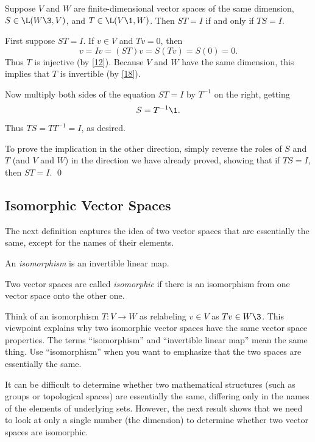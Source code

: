 {Suppose $V$ and $W$ are finite-dimensional vector spaces of the same dimension, $S \in \L(W\3,V)$, and $T \in \L(V\1, W)$.  Then $ST = I$ if and only if $TS = I$.}

\proof
First suppose
$
ST = I$.
If $v \in V$ and $Tv = 0$, then
\[
v = Iv= (ST)v = S(Tv) = S(0) = 0.
\]
Thus $T$ is injective (by \ref{12}). Because $V$ and $W$ have the same dimension, this implies that $T$ is invertible (by \ref{18}).

Now multiply both sides of the equation $ST = I$ by $T^{-1}$ on the right, getting
\[
S = T^{-1}\1.
\]
Thus $TS = TT^{-1} = I$, as desired.

To prove the implication in the other direction, simply reverse the roles of $S$ and $T$ (and $V$ and $W$) in the direction we have already proved, showing that if $TS = I$, then $ST = I$.
\qed

\pagebreak[3]

\subsection{Isomorphic Vector Spaces}

The next definition captures the idea of two vector spaces that are essentially the same, except for the names of their elements.

{\begin{Itemize}
\item
An \emph{isomorphism} is an invertible linear map.
\item
Two vector spaces are called \emph{isomorphic}
if there is an isomorphism from one  vector space onto the other one.
\end{Itemize}}


Think of an isomorphism $T\colon V \to W $ as relabeling $v \in V$ as $Tv \in W\3$. This viewpoint explains why two isomorphic  vector spaces have the same vector
space properties. The terms ``isomorphism'' and ``invertible linear map'' mean
the same thing. Use ``isomorphism'' when you want to emphasize that the two spaces are essentially the same.

It can be difficult to determine whether two mathematical structures (such as groups or topological spaces) are essentially the same, differing only in the names of the elements of underlying sets. However, the next result shows that we need to look at only a single number (the dimension) to determine whether two vector spaces are isomorphic.


